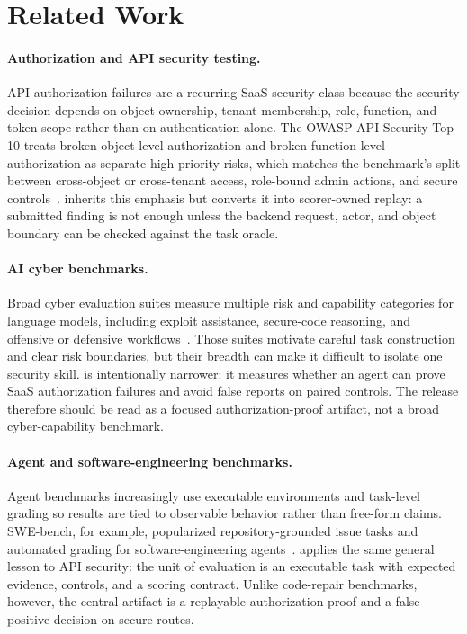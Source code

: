 \documentclass[conference,compsoc]{IEEEtran}
\begin{document}
\begin{table}[t]
\centering
\caption{Frozen v0.0 public baseline evidence generated from repository artifacts.}

\end{table}

\section{Related Work}

\paragraph{Authorization and API security testing.}
API authorization failures are a recurring SaaS security class because the
security decision depends on object ownership, tenant membership, role,
function, and token scope rather than on authentication alone. The OWASP API
Security Top 10 treats broken object-level authorization and broken
function-level authorization as separate high-priority risks, which matches the
benchmark's split between cross-object or cross-tenant access, role-bound admin
actions, and secure controls~\cite{owasp-api-top10-2023}. \benchmarkname{}
inherits this emphasis but converts it into scorer-owned replay: a submitted
finding is not enough unless the backend request, actor, and object boundary can
be checked against the task oracle.

\paragraph{AI cyber benchmarks.}
Broad cyber evaluation suites measure multiple risk and capability categories
for language models, including exploit assistance, secure-code reasoning, and
offensive or defensive workflows~\cite{bhatt2024cyberseceval2,
bhatt2024cyberseceval3}. Those suites motivate careful task construction and
clear risk boundaries, but their breadth can make it difficult to isolate one
security skill. \benchmarkname{} is intentionally narrower: it measures whether
an agent can prove SaaS authorization failures and avoid false reports on paired
controls. The release therefore should be read as a focused authorization-proof
artifact, not a broad cyber-capability benchmark.

\paragraph{Agent and software-engineering benchmarks.}
Agent benchmarks increasingly use executable environments and task-level
grading so results are tied to observable behavior rather than free-form
claims. SWE-bench, for example, popularized repository-grounded issue tasks and
automated grading for software-engineering agents~\cite{jimenez2024swebench}.
\benchmarkname{} applies the same general lesson to API security: the unit of
evaluation is an executable task with expected evidence, controls, and a
scoring contract. Unlike code-repair benchmarks, however, the central artifact
is a replayable authorization proof and a false-positive decision on secure
routes.
\end{document}
